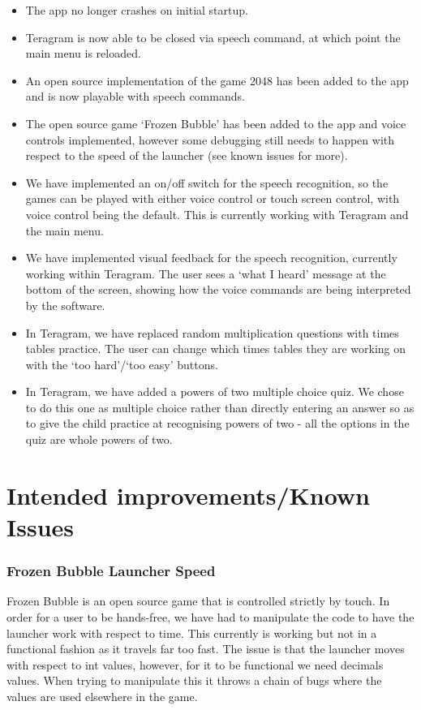 \documentclass[11pt, oneside]{article}
\begin{document}
\begin{itemize}
	\item The app no longer crashes on initial startup.
	\item Teragram is now able to be closed via speech command, at
          which point the main menu is reloaded.
	\item An open source implementation of the game 2048 has been
          added to the app and is now playable with speech commands.
	\item The open source game `Frozen Bubble' has been added to
          the app and voice controls implemented, however some
          debugging still needs to happen with respect to the speed of
          the launcher (see known issues for more).
        \item We have implemented an on/off switch for the speech
          recognition, so the games can be played with either voice
          control or touch screen control, with voice control being
          the default. This is currently working with Teragram and the
          main menu.
        \item We have implemented visual feedback for the speech
          recognition, currently working within Teragram. The user
          sees a `what I heard' message at the bottom of the screen,
          showing how the voice commands are being interpreted by the
          software.
        \item In Teragram, we have replaced random multiplication
          questions with times tables practice. The user can change
          which times tables they are working on with the `too
          hard'/`too easy' buttons.
        \item In Teragram, we have added a powers of two multiple
          choice quiz. We chose to do this one as multiple choice
          rather than directly entering an answer so as to give the
          child practice at recognising powers of two - all the
          options in the quiz are whole powers of two.
\end{itemize}

\pagebreak

\section{Intended improvements/Known Issues}

\subsubsection*{Frozen Bubble Launcher Speed}
Frozen Bubble is an open source game that is controlled strictly by touch. 
In order for a user to be hands-free, we have had to manipulate the code 
to have the launcher work with respect to time. This currently is working
but not in a functional fashion as it travels far too fast. The issue is 
that the launcher moves with respect to int values, however, for it to be 
functional we need decimals values. When trying to manipulate this it 
throws a chain of bugs where the values are used elsewhere in the game. 
\end{document}
